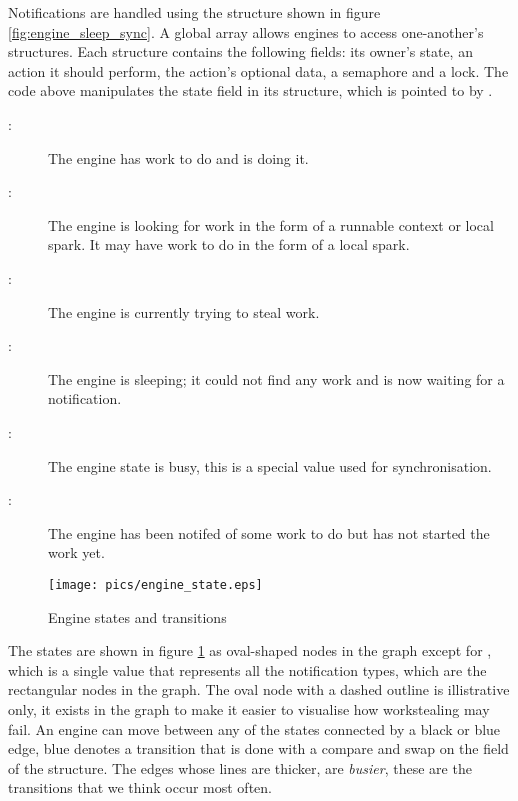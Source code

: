 Notifications are handled using the \enginesleepsync structure shown in
figure \ref{fig:engine_sleep_sync}.
A global array allows engines to access one-another's \enginesleepsync
structures.
Each structure contains the following fields:
its owner's state,
an action it should perform,
the action's optional data,
a semaphore and a lock.
The \idle code above manipulates the state field in its structure,
which is pointed to by .

\begin{description}
    \item[:] The engine has work to do and is doing it.

    \item[:] The engine is looking for work in
        the form of a runnable context or local spark.  It may have work to
        do in the form of a local spark.

    \item[:] The engine is currently trying to steal work.

    \item[:] The engine is sleeping; it could not find any
        work and is now waiting for a notification.

    \item[:] The engine state is busy, this is a special value
        used for synchronisation.

    \item[:] The engine has been notifed of some work to
        do but has not started the work yet.
\end{description}

\begin{figure}
\begin{center}
\texttt{[image: pics/engine\_state.eps]}
\end{center}
\caption{Engine states and transitions}
\label{fig:engine_states}
\end{figure}

\noindent
The states are shown in figure \ref{fig:engine_states} as oval-shaped nodes
in the graph except for ,
which is a single value that represents all the notification types,
which are the rectangular nodes in the graph.
The oval node with a dashed outline is illistrative only,
it exists in the graph to make it easier to visualise how workstealing may
fail.
An engine can move between any of the states connected by a black or blue
edge,
blue denotes a transition that is done with a compare and swap on the
 field of the \enginesleepsync structure.
The edges whose lines are thicker, are \emph{busier},
these are the transitions that we think occur most often.

